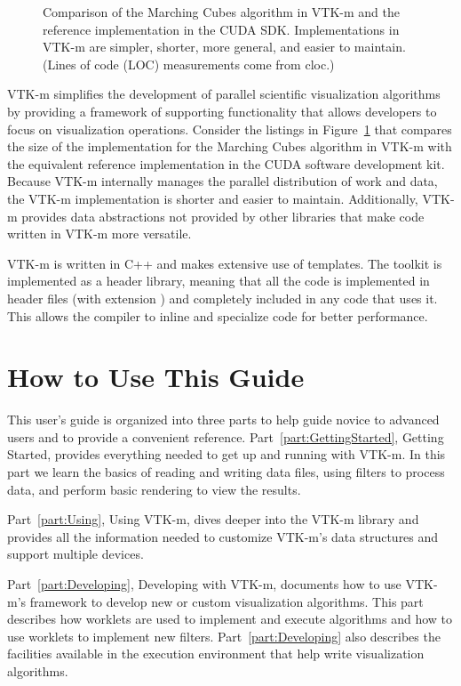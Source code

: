 \begin{figure}[htb]
\begin{tabular}{cc}
  \end{tabular}
  \caption[Comparison of Marching Cubes implementations.]{
    Comparison of the Marching Cubes algorithm in VTK-m and the reference implementation in the CUDA SDK.
    Implementations in VTK-m are simpler, shorter, more general, and easier to maintain.
    (Lines of code (LOC) measurements come from cloc.)}
  \label{fig:MCCompare}
\end{figure}

VTK-m simplifies the development of parallel scientific visualization algorithms by providing a framework of supporting functionality that allows developers to focus on visualization operations.
Consider the listings in Figure~\ref{fig:MCCompare} that compares the size of the implementation for the Marching Cubes algorithm in VTK-m with the equivalent reference implementation in the CUDA software development kit.
Because VTK-m internally manages the parallel distribution of work and data, the VTK-m implementation is shorter and easier to maintain.
Additionally, VTK-m provides data abstractions not provided by other libraries that make code written in VTK-m more versatile.

\begin{didyouknow}
  VTK-m is written in C++ and makes extensive use of templates. The toolkit
  is implemented as a header library, meaning that all the code is
  implemented in header files (with extension ) and
  completely included in any code that uses it. This allows the compiler to
  inline and specialize code for better performance.
\end{didyouknow}

\section{How to Use This Guide}

This user's guide is organized into three parts to help guide novice to
advanced users and to provide a convenient reference.
Part~\ref{part:GettingStarted}, Getting Started, provides everything needed
to get up and running with VTK-m. In this part we learn the basics of
reading and writing data files, using filters to process data, and perform
basic rendering to view the results.

Part~\ref{part:Using}, Using VTK-m, dives deeper into the VTK-m library and
provides all the information needed to customize VTK-m's data structures
and support multiple devices.

Part~\ref{part:Developing}, Developing with VTK-m, documents how to use
VTK-m's framework to develop new or custom visualization algorithms. This
part describes how worklets are used to implement and execute algorithms
and how to use worklets to implement new filters.
Part~\ref{part:Developing} also describes the facilities available in the
execution environment that help write visualization algorithms.

